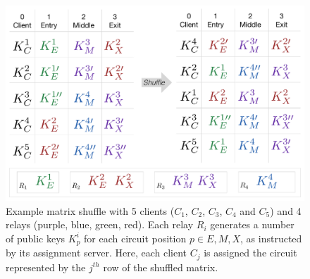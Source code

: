 \begin{figure}
  \centering
    \includegraphics[scale=.6]{shuffle_total.pdf}
  \caption{
    Example matrix shuffle with 5 clients ($C_1$, $C_2$, $C_3$, $C_4$ and $C_5$) 
    and 4 relays (purple, blue, green, red). Each relay $R_i$ generates a number 
    of public keys $K_p^i$ for each circuit position $p \in {E, M, X}$, as 
    instructed by its assignment server. Here, each client $C_j$ is assigned the 
    circuit represented by the $j^{th}$ row of the shuffled matrix. 
  }
  \label{figure:shuffle}
\end{figure}